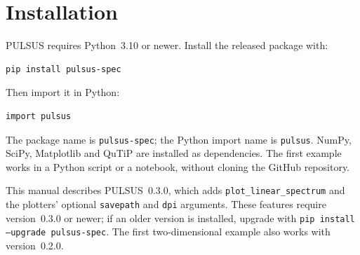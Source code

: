 \section{Installation}
\label{sec:installation}

PULSUS requires Python~3.10 or newer. Install the released package with:
\begin{lstlisting}[style=shell]
pip install pulsus-spec
\end{lstlisting}
Then import it in Python:
\begin{lstlisting}[style=python]
import pulsus
\end{lstlisting}
The package name is \texttt{pulsus-spec}; the Python import name is
\texttt{pulsus}. NumPy, SciPy, Matplotlib and QuTiP are installed as
dependencies. The first example works in a Python script or a notebook, without
cloning the GitHub repository.

This manual describes PULSUS~0.3.0, which adds
\texttt{plot\_linear\_spectrum} and the plotters' optional
\texttt{savepath} and \texttt{dpi} arguments. These features require
version~0.3.0 or newer; if an older version is installed, upgrade with
\texttt{pip install --upgrade pulsus-spec}. The first two-dimensional
example also works with version~0.2.0.
